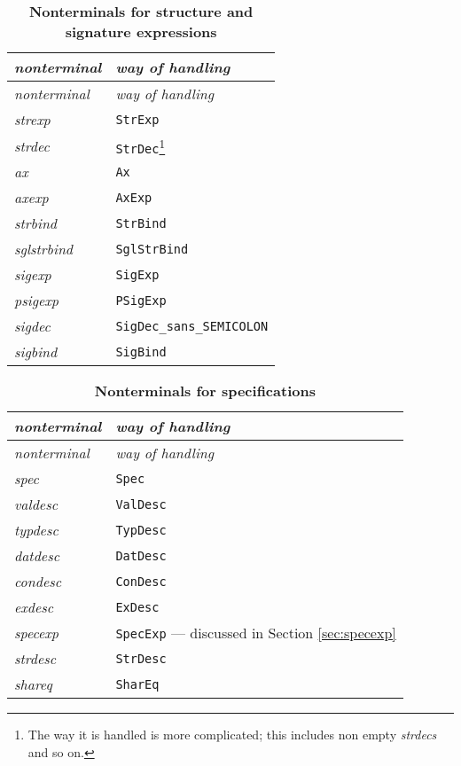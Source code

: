 \begin{longtable}{lp{80mm}}
\caption[Nonterminals for structure and signature expressions]%
{\bf  Nonterminals for structure and signature expressions}\\
\sl nonterminal& \sl way of handling\\[5pt]
\endfirsthead
\sl nonterminal& \sl way of handling\\[5pt]
\endhead
\endfoot
{\it strexp} & {\tt StrExp}\\ 
{\it strdec} & {\tt StrDec}\footnote{The way
  it is handled is more complicated; this includes non empty {\it strdecs}
  and so on.} \\
{\it ax} & {\tt Ax}\\
{\it axexp} & {\tt AxExp}\\
{\it strbind} & {\tt StrBind}\\
{\it sglstrbind} & {\tt  SglStrBind}\\
{\it sigexp} & {\tt SigExp}\\
{\it psigexp} & {\tt PSigExp}\\
{\it sigdec} & {\tt SigDec\_sans\_SEMICOLON}\\
{\it sigbind} & {\tt SigBind}\\
\end{longtable}

\begin{longtable}{lp{80mm}}
\caption[Nonterminals for specifications]%
{\bf  Nonterminals for specifications}\\
\sl nonterminal& \sl way of handling\\[5pt]
\endfirsthead
\sl nonterminal& \sl way of handling\\[5pt]
\endhead
\endfoot
{\it spec} & {\tt Spec}\\
{\it valdesc} & {\tt ValDesc}\\
{\it typdesc} & {\tt TypDesc}\\
{\it datdesc} & {\tt DatDesc}\\
{\it condesc} & {\tt ConDesc}\\
{\it exdesc} & {\tt ExDesc}\\
{\it specexp} & {\tt SpecExp} --- discussed in Section
\ref{sec:specexp}\\
{\it strdesc} & {\tt StrDesc}\\
{\it shareq} & {\tt  SharEq}\\
\end{longtable}

